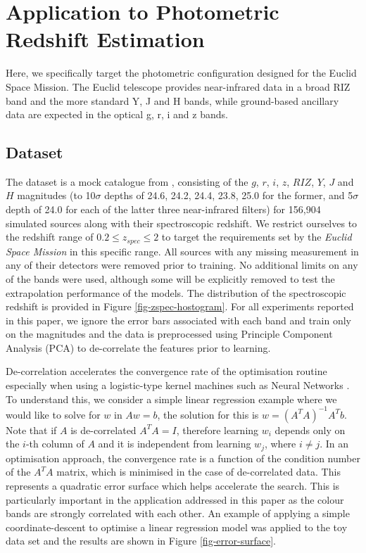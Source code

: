 \documentclass[useAMS,usenatbib,fleqn]{mn2e}
\begin{document}
\section{Application to Photometric Redshift Estimation}
\label{sec-application}

Here, we specifically target the photometric configuration designed for the Euclid Space Mission. The Euclid telescope provides near-infrared data in a broad RIZ band and the more standard Y, J and H bands, while ground-based ancillary data are expected in the optical g, r, i and z bands. 


\subsection{Dataset}
\label{sec-dataset}

The dataset is a mock catalogue from \citet{jouvel09}, consisting of the $g$, $r$, $i$, $z$, $RIZ$, $Y$, $J$ and $H$ magnitudes (to 10$\sigma$ depths of 24.6, 24.2, 24.4, 23.8, 25.0 for the former, and 5$\sigma$ depth of 24.0 for each of the latter three near-infrared filters) for 156,904 simulated sources along with their spectroscopic redshift. We restrict ourselves to the redshift range of $0.2 \le z_{spec} \le 2$ to target the requirements set by the {\em Euclid Space Mission} in this specific range. All sources with any missing measurement in any of their detectors were removed prior to training. No additional limits on any of the bands were used, although some will be explicitly removed to test the extrapolation performance of the models. The distribution of the spectroscopic redshift is provided in Figure \ref{fig-zspec-hostogram}. For all experiments reported in this paper, we ignore the error bars associated with each band and train only on the magnitudes and the data is preprocessed using Principle Component Analysis (PCA) \citep{jolliffe1986} to de-correlate the features prior to learning. 

De-correlation accelerates the convergence rate of the optimisation routine especially when using a logistic-type kernel machines such as Neural Networks \citep{lecun1998}. To understand this, we consider a simple linear regression example where we would like to solve for $w$ in $Aw=b$, the solution for this is $w=\left(A^{T}A\right)^{-1}A^{T}b$. Note that if $A$ is de-correlated $A^{T}A=I$, therefore learning $w_{i}$ depends only on the $i$-th column of $A$ and it is independent from learning $w_{j}$, where $i\ne j$. In an optimisation approach, the convergence rate is a function of the condition number of the $A^{T}A$ matrix, which is minimised in the case of de-correlated data. This represents a quadratic error surface which helps accelerate the search. This is particularly important in the application addressed in this paper as the colour bands are strongly correlated with each other. An example of applying a simple coordinate-descent to optimise a linear regression model was applied to the toy data set and the results are shown in Figure \ref{fig-error-surface}.
\end{document}

